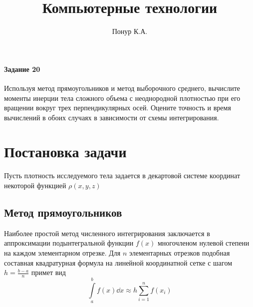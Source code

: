 
\title{Компьютерные технологии}
\author{Понур К.А.}



\maketitle

\paragraph{Задание 20} Используя метод  прямоугольников  и  метод  выборочного  среднего, вычислите моменты инерции тела сложного объема с неоднородной плотностью при его вращении вокруг трех  перпендикулярных  осей. Оцените точность  и  время  вычислений  в  обоих  случаях в зависимости от схемы интегрирования.

\tableofcontents
\section{Постановка задачи}


Пусть плотность исследуемого тела задается в декартовой системе координат 
некоторой функцией $\rho(x,y,z)$

\subsection{Метод прямоугольников}%
\label{sub:metod_priamougol_nikov}

Наиболее простой метод численного интегрирования заключается в аппроксимации
подынтегральной функции $f(x)$ многочленом нулевой степени на каждом
элементарном отрезке. Для $n$ элементарных отрезков подобная составная
квадратурная формула на линейной координатной сетке с шагом
$h=\frac{b-a}{n}$ примет вид
\begin{equation}
    \label{eq:rect}
    \int\limits_{a}^{b} f(x) \dd x \approx h\sum\limits_{i=1}^{n} f(x_i) 
\end{equation}

